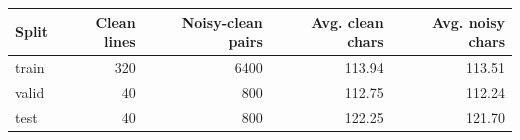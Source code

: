 \begin{tabular}{lrrrr}
\toprule
Split & Clean lines & Noisy-clean pairs & Avg. clean chars & Avg. noisy chars \\
\midrule
train & 320 & 6400 & 113.94 & 113.51 \\
valid & 40 & 800 & 112.75 & 112.24 \\
test & 40 & 800 & 122.25 & 121.70 \\
\bottomrule
\end{tabular}
